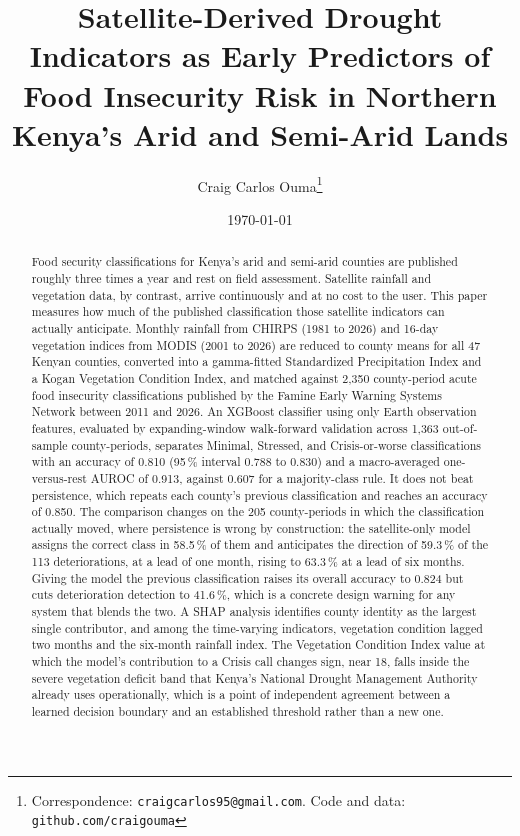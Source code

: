 \documentclass[11pt]{article}
\title{\textbf{Satellite-Derived Drought Indicators as Early Predictors of\\
Food Insecurity Risk in Northern Kenya's Arid and Semi-Arid Lands}}
\author[1]{Craig Carlos Ouma\thanks{%
Correspondence: \texttt{craigcarlos95@gmail.com}. Code and data:
\texttt{github.com/craigouma}}}
\affil[1]{Independent Researcher}
\date{\today}
\begin{document}
\maketitle

\begin{abstract}
\noindent
Food security classifications for Kenya's arid and semi-arid counties are
published roughly three times a year and rest on field assessment. Satellite
rainfall and vegetation data, by contrast, arrive continuously and at no cost to
the user. This paper measures how much of the published classification those
satellite indicators can actually anticipate. Monthly rainfall from CHIRPS
(1981 to 2026) and 16-day vegetation indices from MODIS (2001 to 2026) are
reduced to county means for all 47 Kenyan counties, converted into a
gamma-fitted Standardized Precipitation Index and a Kogan Vegetation Condition
Index, and matched against 2,350 county-period acute food insecurity
classifications published by the Famine Early Warning Systems Network between
2011 and 2026. An XGBoost classifier using only Earth observation features,
evaluated by expanding-window walk-forward validation across 1,363
out-of-sample county-periods, separates Minimal, Stressed, and Crisis-or-worse
classifications with an accuracy of 0.810 (95\,\% interval 0.788 to 0.830) and a
macro-averaged one-versus-rest AUROC of 0.913, against 0.607 for a majority-class
rule. It does not beat persistence, which repeats each county's previous
classification and reaches an accuracy of 0.850. The comparison changes on the
205 county-periods in which the classification actually moved, where persistence
is wrong by construction: the satellite-only model assigns the correct class in
58.5\,\% of them and anticipates the direction of 59.3\,\% of the 113
deteriorations, at a lead of one month, rising to 63.3\,\% at a lead of six
months. Giving the model the previous classification raises its overall accuracy
to 0.824 but cuts deterioration detection to 41.6\,\%, which is a concrete design
warning for any system that blends the two. A SHAP analysis identifies county
identity as the largest single contributor, and among the time-varying
indicators, vegetation condition lagged two months and the six-month rainfall
index. The Vegetation Condition Index value at which the model's contribution to
a Crisis call changes sign, near 18, falls inside the severe vegetation deficit
band that Kenya's National Drought Management Authority already uses
operationally, which is a point of independent agreement between a learned
decision boundary and an established threshold rather than a new one.
\end{abstract}
\end{document}

